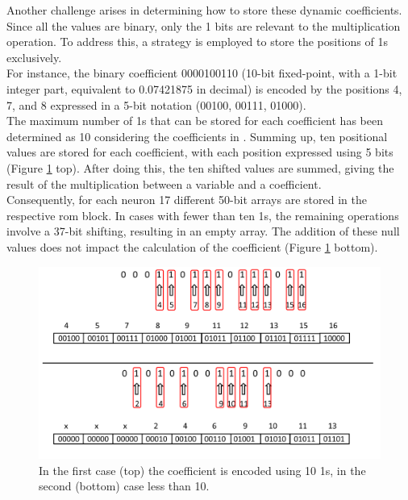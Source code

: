 Another challenge arises in determining how to store these dynamic coefficients. 
Since all the values are binary, only the 1 bits are relevant to the multiplication 
operation. To address this, a strategy is employed to store the positions of 1s 
exclusively.\\
For instance, the binary coefficient 0000100110 (10-bit fixed-point, with a 1-bit 
integer part, equivalent to 0.07421875 in decimal) is encoded by the 
positions 4, 7, and 8 expressed in a 5-bit notation (00100, 00111, 01000).\\
The maximum number of 1s that can be stored for each coefficient has been 
determined as 10 considering the coefficients in \cite{Nanami}. Summing up, 
ten positional values are stored for each coefficient, with each position 
expressed using 5 bits (Figure \ref{fig:50bits} top). After doing this, 
the ten shifted values are summed, giving the result of the multiplication 
between a variable and a coefficient.\\
Consequently, for each neuron 17 different 50-bit arrays are stored in the 
respective \acrshort{rom} block. In cases with fewer than ten 1s, the remaining operations 
involve a 37-bit shifting, resulting in an empty array. The addition of these null 
values does not impact the calculation of the coefficient (Figure \ref{fig:50bits} 
bottom).\\

\begin{figure}[hbt!]
    \begin{center}
    \includegraphics[width=1\linewidth]{img/50bitsss.png}
    \end{center}
    \caption[Encoding a coefficient in a 50-bits array]{In the first case (top) the coefficient is encoded using 10 1s, in the second (bottom) case less than 10.}
    \label{fig:50bits}
\end{figure}

